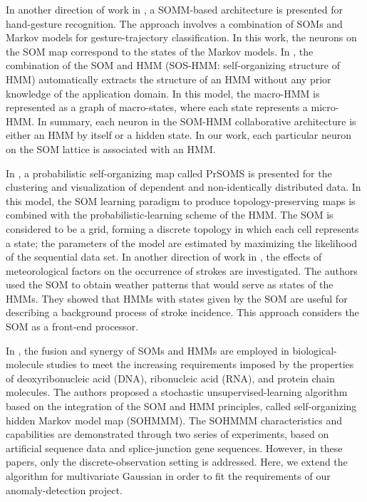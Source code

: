 In another direction of work in \citet{Caridakis2010}, a SOMM-based architecture is presented for hand-gesture recognition. The approach involves a combination of SOMs and Markov models for gesture-trajectory classification. In this work, the neurons on the SOM map correspond to the states of the Markov models. In \citet{Jaziri2011}, the combination of the SOM and HMM (SOS-HMM: self-organizing structure of HMM) automatically extracts the structure of an HMM without any prior knowledge of the application domain. In this model, the macro-HMM is represented as a graph of macro-states, where each state represents a micro-HMM. In summary, each neuron in the SOM-HMM collaborative architecture is either an HMM by itself or a hidden state. In our work, each particular neuron on the SOM lattice is associated with an HMM. 

In \citet{Lebbah2015}, a probabilistic self-organizing map called PrSOMS is presented for the clustering and visualization of dependent and non-identically distributed data. In this model, the SOM learning paradigm to produce topology-preserving maps is combined with the probabilistic-learning scheme of the HMM. The SOM is considered to be a grid, forming a discrete topology in which each cell represents a state; the parameters of the model are estimated by maximizing the likelihood of the sequential data set. In another direction of work in \citet{Morimoto2016}, the effects of meteorological factors on the occurrence of strokes are investigated. The authors used the SOM to obtain weather patterns that would serve as states of the HMMs. They showed that HMMs with states given by the SOM are useful for describing a background process of stroke incidence. This approach considers the SOM as a front-end processor.

In \citet{Ferles2008,Ferles2013,Ferles2017}, the fusion and synergy of SOMs and HMMs are employed in biological-molecule studies to meet the increasing requirements imposed by the properties of deoxyribonucleic acid (DNA), ribonucleic acid (RNA), and protein chain molecules. The authors proposed a stochastic unsupervised-learning algorithm based on the integration of the SOM and HMM principles, called self-organizing hidden Markov model map (SOHMMM). The SOHMMM characteristics and capabilities are demonstrated through two series of experiments, based on artificial sequence data and splice-junction gene sequences. However, in these papers, only the discrete-observation setting is addressed. Here, we extend the algorithm for multivariate Gaussian in order to fit the requirements of our anomaly-detection project.

